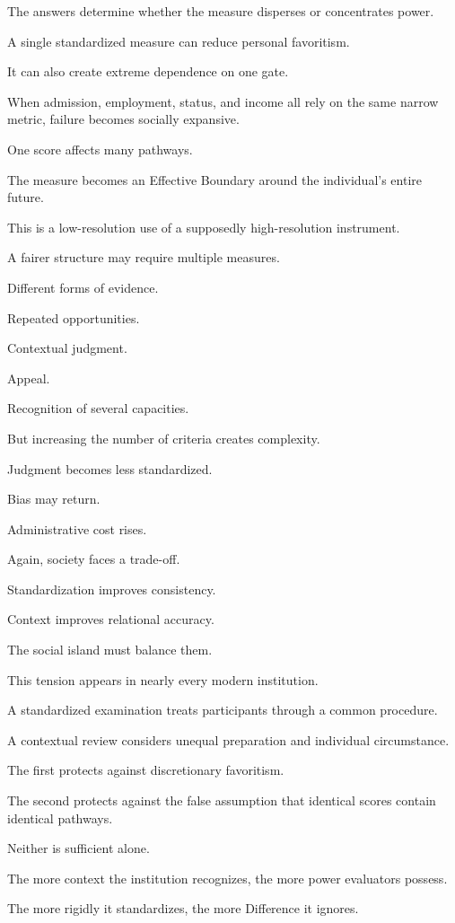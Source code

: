 The answers determine whether the measure disperses or concentrates power.

A single standardized measure can reduce personal favoritism.

It can also create extreme dependence on one gate.

When admission, employment, status, and income all rely on the same narrow metric, failure becomes socially expansive.

One score affects many pathways.

The measure becomes an Effective Boundary around the individual’s entire future.

This is a low-resolution use of a supposedly high-resolution instrument.

A fairer structure may require multiple measures.

Different forms of evidence.

Repeated opportunities.

Contextual judgment.

Appeal.

Recognition of several capacities.

But increasing the number of criteria creates complexity.

Judgment becomes less standardized.

Bias may return.

Administrative cost rises.

Again, society faces a trade-off.

Standardization improves consistency.

Context improves relational accuracy.

The social island must balance them.

This tension appears in nearly every modern institution.

A standardized examination treats participants through a common procedure.

A contextual review considers unequal preparation and individual circumstance.

The first protects against discretionary favoritism.

The second protects against the false assumption that identical scores contain identical pathways.

Neither is sufficient alone.

The more context the institution recognizes, the more power evaluators possess.

The more rigidly it standardizes, the more Difference it ignores.

